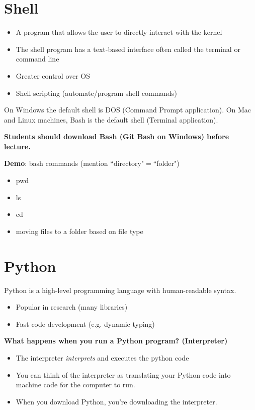 \documentclass[12pt]{article}
\numberwithin{equation}{section}
\begin{document}
\section{Shell}
\begin{itemize}
    \item A program that allows the user to directly interact with the kernel
    \item The shell program has a text-based interface often called the terminal or command line
    \item Greater control over OS
    \item Shell scripting (automate/program shell commands)
\end{itemize}

On Windows the default shell is DOS (Command Prompt application). On Mac and Linux machines, Bash is the default shell (Terminal application).

\textbf{Students should download Bash (Git Bash on Windows) before lecture.
}

\textbf{Demo}: bash commands (mention ``directory"$=$``folder")
\begin{itemize}
    \item pwd
    \item ls
    \item cd
    \item moving files to a folder based on file type
\end{itemize}

\section{Python}

Python is a high-level programming language with human-readable syntax.
\begin{itemize}
    \item Popular in research (many libraries)
    \item Fast code development (e.g. dynamic typing) 
\end{itemize}

\textbf{What happens when you run a Python program? (Interpreter)}
\begin{itemize}
    \item The interpreter \textit{interprets} and executes the python code
    \item You can think of the interpreter as translating your Python code into machine code for the computer to run.
    \item When you download Python, you're downloading the interpreter.
\end{itemize}
\end{document}
